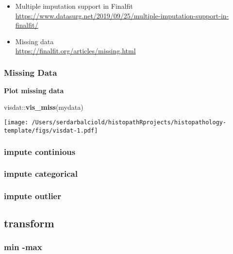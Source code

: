 \documentclass[
]{article}
\newenvironment{Shaded}{\begin{snugshade}}{\end{snugshade}}
\newcommand{\KeywordTok}[1]{\textcolor[rgb]{0.12,0.11,0.11}{\textbf{#1}}}
\newcommand{\NormalTok}[1]{\textcolor[rgb]{0.12,0.11,0.11}{#1}}
\newcommand{\OperatorTok}[1]{\textcolor[rgb]{0.12,0.11,0.11}{#1}}
\begin{document}
\begin{itemize}
\item
  Multiple imputation support in Finalfit\\
  \url{https://www.datasurg.net/2019/09/25/multiple-imputation-support-in-finalfit/}
\item
  Missing data\\
  \url{https://finalfit.org/articles/missing.html}
\end{itemize}

\hypertarget{missing-data}{%
\subsubsection{Missing Data}\label{missing-data}}

\textbf{Plot missing data}

\begin{Shaded}
\begin{Highlighting}[]
\NormalTok{visdat}\OperatorTok{::}\KeywordTok{vis_miss}\NormalTok{(mydata)}
\end{Highlighting}
\end{Shaded}

\texttt{[image: /Users/serdarbalciold/histopathRprojects/histopathology-template/figs/visdat-1.pdf]}

\hypertarget{impute-continious}{%
\subsubsection{impute continious}\label{impute-continious}}

\hypertarget{impute-categorical}{%
\subsubsection{impute categorical}\label{impute-categorical}}

\hypertarget{impute-outlier}{%
\subsubsection{impute outlier}\label{impute-outlier}}

\hypertarget{transform}{%
\subsection{transform}\label{transform}}

\hypertarget{min--max}{%
\subsubsection{min -max}\label{min--max}}
\end{document}
